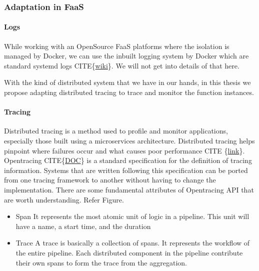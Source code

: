 \documentclass[12pt,titlepage]{article}
\begin{document}
\subsubsection{Adaptation in FaaS}
\label{sec:orgbab1c7f}

\paragraph{Logs}
\label{sec:orga6e061b}
While working with an OpenSource FaaS platforms where the isolation is managed
by Docker, we can use the inbuilt logging system by Docker which are standard
systemd logs CITE\{\href{https://en.wikipedia.org/wiki/Systemd}{wiki}\}. We will not get into details of that here.

With the kind of distributed system that we have in our hands, in this thesis we
propose adapting distributed tracing to trace and monitor the
function instances.

\paragraph{Tracing}
\label{sec:org86c8946}
Distributed tracing is a method used to profile and monitor applications,
especially those built using a microservices architecture. Distributed tracing
helps pinpoint where failures occur and what causes poor performance CITE
\{\href{https://medium.com/velotio-perspectives/a-comprehensive-tutorial-to-implementing-opentracing-with-jaeger-a01752e1a8ce}{link}\}. Opentracing CITE\{\href{https://opentracing.io/docs/}{DOC}\} is a standard specification for the definition of tracing
information. Systems that are written following this specification can be ported
from one tracing framework to another without having to change the
implementation. There are some fundamental attributes of Opentracing API that
are worth understanding. Refer Figure.
\begin{itemize}
\item Span
It represents the most atomic unit of logic in a pipeline. This unit will have
a name, a start time, and the duration
\item Trace
A trace is basically a collection of spans. It represents the workflow of the
entire pipeline. Each distributed component in the pipeline contribute their
own spans to form the trace from the aggregation.
\end{itemize}
\end{document}
